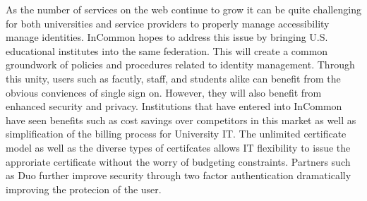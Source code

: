 \documentclass[9pt,twocolumn,twoside]{../../styles/osajnl}
\begin{document}
As the number of services on the web continue to grow it can be quite
challenging for both universities and service providers to properly
manage accessibility manage identities.  InCommon hopes to address
this issue by bringing U.S. educational institutes into the same
federation.  This will create a common groundwork of policies and
procedures related to identity management.  Through this unity, users
such as facutly, staff, and students alike can benefit from the
obvious conviences of single sign on.  However, they will also benefit
from enhanced security and privacy.  Institutions that have entered
into InCommon have seen benefits such as cost savings over competitors
in this market as well as simplification of the billing process for
University IT.  The unlimited certificate model as well as the diverse
types of certifcates allows IT flexibility to issue the approriate
certificate without the worry of budgeting constraints.  Partners such
as Duo further improve security through two factor authentication
dramatically improving the protecion of the user.




 
\end{document}
